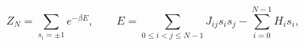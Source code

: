 \begin{equation}\label{Zising}
Z_N=\sum_{s_i=\pm1} e^{- \beta E}, \qquad
E =\sum_{0\leq i<j \leq N-1} J_{ij}s_is_j -\sum_{i=0}^{N-1} H_i s_i,
\end{equation}

